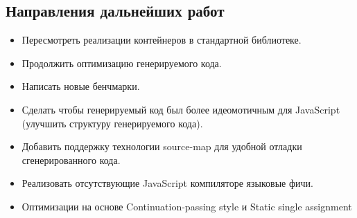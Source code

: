\subsection{Направления дальнейших работ}

\begin{itemize}
\item Пересмотреть реализации контейнеров в стандартной библиотеке.
\item Продолжить оптимизацию генерируемого кода.
\item Написать новые бенчмарки. 
\item Сделать чтобы генерируемый код был более идеомотичным для JavaScript (улучшить структуру генерируемого кода).
\item Добавить поддержку технологии source-map для удобной отладки сгенерированного кода.
\item Реализовать отсутствующие JavaScript компиляторе языковые фичи.
\item Оптимизации на основе Continuation-passing style и 
Static single assignment
\end{itemize}